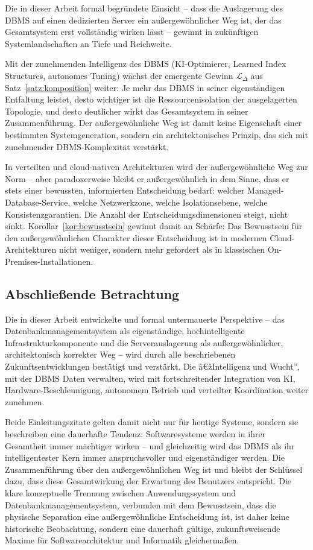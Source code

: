 ﻿\documentclass[a4paper,12pt]{article}
\theoremstyle{definition}
\begin{document}
Die in dieser Arbeit formal begründete Einsicht -- dass die Auslagerung des DBMS auf einen dedizierten Server ein außergewöhnlicher Weg ist, der das Gesamtsystem erst vollständig wirken lässt -- gewinnt in zukünftigen Systemlandschaften an Tiefe und Reichweite.

Mit der zunehmenden Intelligenz des DBMS (KI-Optimierer, Learned Index Structures, autonomes Tuning) wächst der emergente Gewinn $\mathcal{L}_\Delta$ aus Satz~\ref{satz:komposition} weiter: Je mehr das DBMS in seiner eigenständigen Entfaltung leistet, desto wichtiger ist die Ressourcenisolation der ausgelagerten Topologie, und desto deutlicher wirkt das Gesamtsystem in seiner Zusammenführung. Der außergewöhnliche Weg ist damit keine Eigenschaft einer bestimmten Systemgeneration, sondern ein architektonisches Prinzip, das sich mit zunehmender DBMS-Komplexität verstärkt.

In verteilten und cloud-nativen Architekturen wird der außergewöhnliche Weg zur Norm -- aber paradoxerweise bleibt er außergewöhnlich in dem Sinne, dass er stets einer bewussten, informierten Entscheidung bedarf: welcher Managed-Database-Service, welche Netzwerkzone, welche Isolationsebene, welche Konsistenzgarantien. Die Anzahl der Entscheidungsdimensionen steigt, nicht sinkt. Korollar~\ref{kor:bewusstsein} gewinnt damit an Schärfe: Das Bewusstsein für den außergewöhnlichen Charakter dieser Entscheidung ist in modernen Cloud-Architekturen nicht weniger, sondern mehr gefordert als in klassischen On-Premises-Installationen.

\subsection{Abschließende Betrachtung}

Die in dieser Arbeit entwickelte und formal untermauerte Perspektive -- das Datenbankmanagementsystem als eigenständige, hochintelligente Infrastrukturkomponente und die Serverauslagerung als außergewöhnlicher, architektonisch korrekter Weg -- wird durch alle beschriebenen Zukunftsentwicklungen bestätigt und verstärkt. Die â€žIntelligenz und Wucht'', mit der DBMS Daten verwalten, wird mit fortschreitender Integration von KI, Hardware-Beschleunigung, autonomem Betrieb und verteilter Koordination weiter zunehmen.

Beide Einleitungszitate gelten damit nicht nur für heutige Systeme, sondern sie beschreiben eine dauerhafte Tendenz: Softwaresysteme werden in ihrer Gesamtheit immer mächtiger wirken -- und gleichzeitig wird das DBMS als ihr intelligentester Kern immer anspruchsvoller und eigenständiger werden. Die Zusammenführung über den außergewöhnlichen Weg ist und bleibt der Schlüssel dazu, dass diese Gesamtwirkung der Erwartung des Benutzers entspricht. Die klare konzeptuelle Trennung zwischen Anwendungssystem und Datenbankmanagementsystem, verbunden mit dem Bewusstsein, dass die physische Separation eine außergewöhnliche Entscheidung ist, ist daher keine historische Beobachtung, sondern eine dauerhaft gültige, zukunftsweisende Maxime für Softwarearchitektur und Informatik gleichermaßen.
\end{document}
